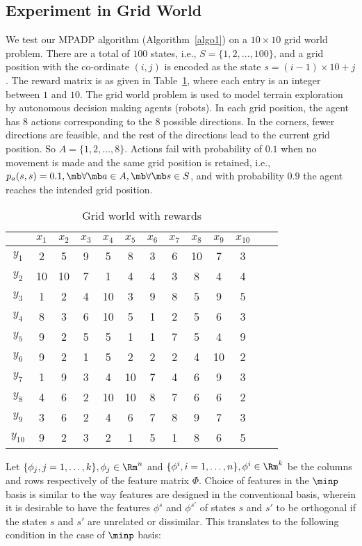 \subsection{Experiment in Grid World}\label{exper}
We test our MPADP algorithm (Algorithm~\ref{algo1}) on a $10 \times 10$ grid world problem. There are a total of $100$ states, i.e., $S=\{1,2,\ldots,100\}$, and a grid position with the co-ordinate $(i,j)$ is encoded as the state $s=(i-1)\times 10+j$. The reward matrix is as given in Table~\ref{reward}, where each entry is an integer between $1$ and $10$. 
The grid world problem is used to model terrain exploration by autonomous decision making agents (robots).
In each grid position, the agent has $8$ actions corresponding to the $8$ possible directions. In the corners, fewer directions are feasible, and the rest of the directions lead to the current grid position. So $A=\{1,2,\ldots,8\}$. Actions fail with probability of $0.1$ when no movement is made and the same grid position is retained, i.e., $p_a(s,s)=0.1, \mb \forall \mb a \in A, \mb \forall \mb s \in S$, and with probability $0.9$ the agent reaches the intended grid position.
\begin{table}
\begin{tabular}{c|c|c|c|c|c|c|c|c|c|c|c|c}\hline
&$x_{1}$	&$x_{2}$	&$x_{3}$	&$x_{4}$	&$x_{5}$	&$x_{6}$	&$x_{7}$	&$x_{8}$	&$x_{9}$	&$x_{10}$	\\ \hline 
$y_{1}$	&2	&5	&9	&5	&8	&3	&6	&10	&7	&3	\\ \hline 
$y_{2}$	&10	&10	&7	&1	&4	&4	&3	&8	&4	&4	\\ \hline 
$y_{3}$	&1	&2	&4	&10	&3	&9	&8	&5	&9	&5	\\ \hline 
$y_{4}$	&8	&3	&6	&10	&5	&1	&2	&5	&6	&3	\\ \hline 
$y_{5}$	&9	&2	&5	&5	&1	&1	&7	&5	&4	&9	\\ \hline 
$y_{6}$	&9	&2	&1	&5	&2	&2	&2	&4	&10	&2	\\ \hline 
$y_{7}$	&1	&9	&3	&4	&10	&7	&4	&6	&9	&3	\\ \hline 
$y_{8}$	&4	&6	&2	&10	&10	&8	&7	&6	&6	&2	\\ \hline 
$y_{9}$	&3	&6	&2	&4	&6	&7	&8	&9	&7	&3	\\ \hline 
$y_{10}$	&9	&2	&3	&2	&1	&5	&1	&8	&6	&5	\\ \hline 
\end{tabular}
\caption{Grid world with rewards}
\label{reward}
\end{table}
Let $\{\phi_j, j=1,\ldots,k\}, \phi_j \in \Rm^n$ and $\{\phi^i,i=1,\ldots,n\}, \phi^i \in \Rm^k$ be the columns and rows respectively of the feature matrix $\Phi$. Choice of features in the $\minp$ basis is similar to the way features are designed in the conventional basis, wherein it is desirable to have the features $\phi^{s}$ and $\phi^{s'}$ of states $s$ and $s'$ to be orthogonal if the states $s$ and $s'$ are unrelated or dissimilar. This translates to the following condition in the case of $\minp$ basis:
